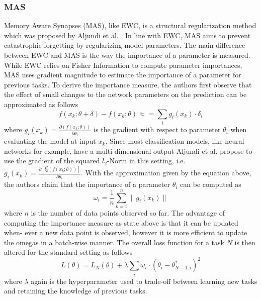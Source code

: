 \subsubsection{MAS}
Memory Aware Synapses (MAS), like EWC, is a structural regularization method which was proposed by Aljundi et al. \cite{aljundi2018memory}. In line with
EWC, MAS aims to prevent catastrophic forgetting by regularizing model parameters. The main difference between EWC and MAS is the way the importance of
a parameter is measured. While EWC relies on Fisher Information to compute parameter importances, MAS uses gradient magnitude to estimate the importance
of a parameter for previous tasks. To derive the importance measure, the authors first observe that the effect of small changes to the network parameters
on the prediction can be approximated as follows
\begin{equation}
    f(x_k; \theta + \delta) - f(x_k; \theta) \approx = \sum_i g_i(x_k) \cdot \delta_i
\end{equation}
where $g_i(x_k) = \frac{\partial(f(x_k;\theta))}{\partial \theta_i}$  is the gradient with respect to parameter $\theta_i$ when evaluating the model at
input $x_k$. Since most classification models, like neural networks for example, have a multi-dimensional output Aljundi et al. propose to use the gradient
of the squared $l_2$-Norm in this setting, i.e. $g_i(x_k) =  \frac{\partial[l^2_2(f(x_k;\theta))]}{\partial \theta_i}$. With the approximation given by the
equation above, the authors claim that the importance of a parameter $\theta_i$ can be computed as
\begin{equation}
    \omega_i = \frac{1}{n} \sum_{k=1}^n \lVert g_i(x_k) \rVert
\end{equation}
where $n$ is the number of data points observed so far. The advantage of computing the importance measure as state above is that it can be updated when-
ever a new data point is observed, however it is more efficient to update the omegas in a batch-wise manner. The overall loss function for a task $N$ is
then altered for the standard setting as follows
\begin{equation}
    L(\theta) = L_N(\theta) + \lambda \sum_i \omega_i \cdot (\theta_i - \theta^*_{N-1,i})^2
\end{equation}
where $\lambda$ again is the hyperparameter used to trade-off between learning new tasks and retaining the knowledge of previous tasks.
